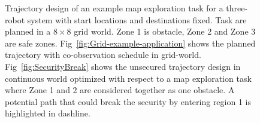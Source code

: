 \documentclass[10pt,twocolumn,twoside]{IEEEtran}
\begin{document}
\begin{figure}
     \centering
     \caption{Trajectory design of an example map exploration task for a three-robot system with start locations and destinations fixed. Task are planned in a $8 \times 8$ grid world. Zone 1 is obstacle, Zone 2 and Zone 3 are safe zones. Fig~\ref{fig:Grid-example-application} shows the planned trajectory with co-observation schedule in grid-world. Fig~\ref{fig:SecurityBreak} shows the unsecured trajectory design in continuous world optimized with respect to a map exploration task where Zone 1 and 2 are considered together as one obstacle.  A potential path that could break the security by entering region 1 is highlighted in dashline.}
     \label{fig:example-application}
 \end{figure}

\end{document}
